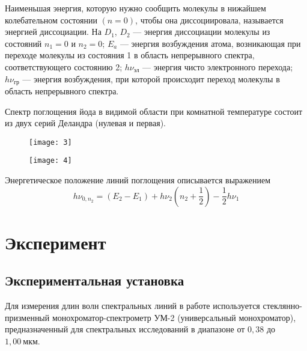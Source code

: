 \documentclass[a4paper, 12pt]{article}
\begin{document}
Наименьшая энергия, которую нужно сообщить молекулы в нижайшем
колебательном состоянии $(n  = 0)$, чтобы она диссоциировала,
называется энергией диссоциации. На  $D_1$, $D_2$ ---
энергия диссоциации молекулы из состояний $n_1 = 0$ и $n_2 = 0$; $E_a$
--- энергия возбуждения атома, возникающая при переходе молекулы из
состояния 1 в область непрерывного спектра, соответствующего состоянию
2; $h\nu_\text{эл}$ --- энергия чисто электронного перехода; $h
\nu_\text{гр}$ --- энергия возбуждения, при которой происходит переход
молекулы в область непрерывного спектра.

Спектр поглощения йода в видимой области при комнатной температуре
состоит из двух серий Деландра (нулевая и первая).


\begin{figure}[H]
    \begin{floatrow}

        {
        \texttt{[image: 3]}
    }

        {
        \texttt{[image: 4]}
    }
    \end{floatrow}
\end{figure}

Энергетическое положение линий поглощения описывается выражением 
\begin{equation}
    h\nu_{0, n_2} = (E_2 - E_1) + h\nu_2 \left( n_2 + \frac{1}{2}
    \right) - \frac{1}{2}h\nu_1
    \label{eq:eq}
\end{equation}



\section{Эксперимент}


\subsection{Экспериментальная установка}


Для измерения длин волн спектральных линий в работе используется
стеклянно-призменный монохроматор-спектрометр УМ-2 (универсальный
монохроматор), предназначенный для спектральных исследований в
диапазоне от $0,38$ до $1,00\: \text{мкм}$.
\end{document}
